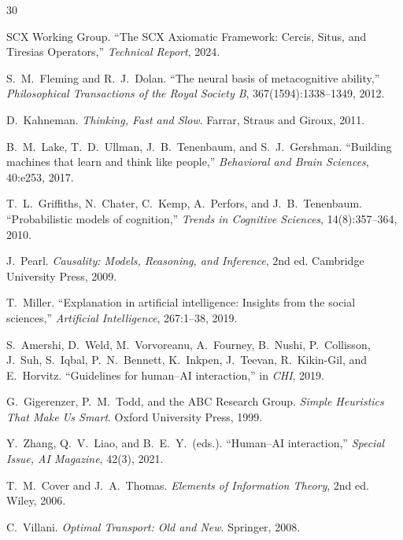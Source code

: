 \documentclass[12pt,a4paper]{article}
\begin{document}

\begin{thebibliography}{30}

SCX Working Group.
\newblock ``The SCX Axiomatic Framework: Cercis, Situs, and Tiresias
Operators,''
\newblock \emph{Technical Report}, 2024.

S.~M.~Fleming and R.~J.~Dolan.
\newblock ``The neural basis of metacognitive ability,''
\newblock \emph{Philosophical Transactions of the Royal Society B},
367(1594):1338--1349, 2012.

D.~Kahneman.
\newblock \emph{Thinking, Fast and Slow}.
\newblock Farrar, Straus and Giroux, 2011.

B.~M.~Lake, T.~D.~Ullman, J.~B.~Tenenbaum, and S.~J.~Gershman.
\newblock ``Building machines that learn and think like people,''
\newblock \emph{Behavioral and Brain Sciences}, 40:e253, 2017.

T.~L.~Griffiths, N.~Chater, C.~Kemp, A.~Perfors, and J.~B.~Tenenbaum.
\newblock ``Probabilistic models of cognition,''
\newblock \emph{Trends in Cognitive Sciences}, 14(8):357--364, 2010.

J.~Pearl.
\newblock \emph{Causality: Models, Reasoning, and Inference}, 2nd ed.
\newblock Cambridge University Press, 2009.

T.~Miller.
\newblock ``Explanation in artificial intelligence: Insights from the social
sciences,''
\newblock \emph{Artificial Intelligence}, 267:1--38, 2019.

S.~Amershi, D.~Weld, M.~Vorvoreanu, A.~Fourney, B.~Nushi, P.~Collisson,
J.~Suh, S.~Iqbal, P.~N.~Bennett, K.~Inkpen, J.~Teevan, R.~Kikin-Gil, and
E.~Horvitz.
\newblock ``Guidelines for human--AI interaction,''
\newblock in \emph{CHI}, 2019.

G.~Gigerenzer, P.~M.~Todd, and the ABC Research Group.
\newblock \emph{Simple Heuristics That Make Us Smart}.
\newblock Oxford University Press, 1999.

Y.~Zhang, Q.~V.~Liao, and B.~E.~Y.~(eds.).
\newblock ``Human--AI interaction,''
\newblock \emph{Special Issue, AI Magazine}, 42(3), 2021.

T.~M.~Cover and J.~A.~Thomas.
\newblock \emph{Elements of Information Theory}, 2nd ed.
\newblock Wiley, 2006.

C.~Villani.
\newblock \emph{Optimal Transport: Old and New}.
\newblock Springer, 2008.

\end{thebibliography}
\end{document}
